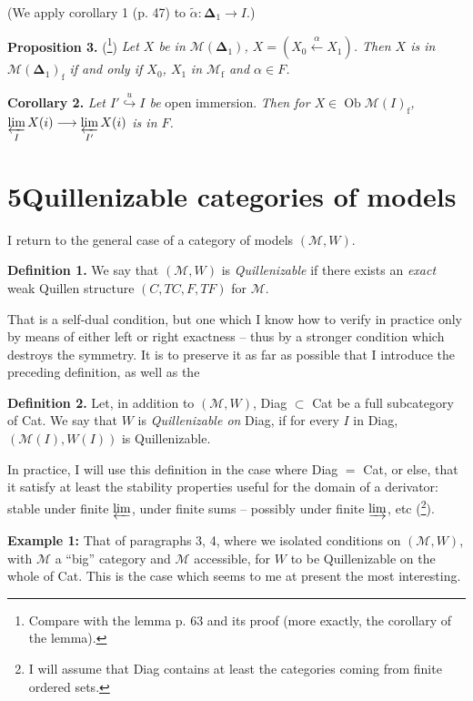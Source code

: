 (We apply corollary 1 (p. 47) to $\tilde{\alpha} : \boldsymbol{\Delta}_1 \longrightarrow I$.)

\textbf{Proposition 3.} (\footnote[28]{Compare with the lemma p. 63 and its proof (more exactly, the corollary of the lemma).}) \textit{Let $X$ be in $\mathcal{M}(\boldsymbol{\Delta}_1)$, $X = (X_0 \xleftarrow{\alpha} X_1)$. Then $X$ is in $\mathcal{M}(\boldsymbol{\Delta}_1)_{\mathrm{f}}$ if and only if $X_0$, $X_1$} \textit{in $\mathcal{M}_{\mathrm{f}}$ and $\alpha \in F$.}

\textbf{Corollary 2.} \textit{Let $I' \overset{u}{\hookrightarrow} I$ be} open immersion. \textit{Then for $X \in \operatorname{Ob}\mathcal{M}(I)_{\mathrm{f}}$, $\varprojlim\limits_{I} X(i) \longrightarrow \varprojlim\limits_{I'} X(i)$ is in $F$.}

\section*{5\quad Quillenizable categories of models}

I return to the general case of a category of models $(\mathcal{M},W)$.

\textbf{Definition 1.} We say that $(\mathcal{M},W)$ is \textit{Quillenizable} if there exists an \textit{exact} weak Quillen structure $(C,TC,F,TF)$ for $\mathcal{M}$.

That is a self-dual condition, but one which I know how to verify in practice only by means of either left or right exactness -- thus by a stronger condition which destroys the symmetry. It is to preserve it as far as possible that I introduce the preceding definition, as well as the

\textbf{Definition 2.} Let, in addition to $(\mathcal{M},W)$, Diag $\subset$ Cat be a full subcategory of Cat. We say that
$W$ is \textit{Quillenizable on} Diag, if for every $I$ in Diag, $(\mathcal{M}(I),W(I))$ is Quillenizable.

In practice, I will use this definition in the case where Diag $=$ Cat, or else, that it satisfy at least the stability properties useful for the domain of a derivator: stable under finite $\varprojlim$, under finite sums -- possibly under finite $\varinjlim$, etc (\footnote[29]{I will assume that Diag contains at least the categories coming from finite ordered sets.}). %

\textbf{Example 1:} That of paragraphs 3, 4, where we isolated conditions on $(\mathcal{M},W)$, with $\mathcal{M}$ a ``big'' category and $\mathcal{M}$ accessible, for $W$ to be Quillenizable on the whole of Cat. This is the case which seems to me at present the most interesting.

